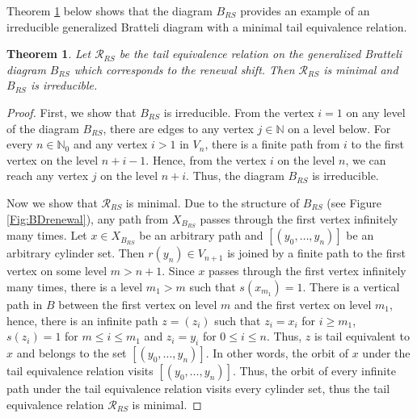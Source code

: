 \documentclass[11pt, twoside]{amsart}
\theoremstyle{definition}
\theoremstyle{remark}
\theoremstyle{plain}
\newtheorem{theorem}[definition]{Theorem}
\newcommand{\N}{\mathbb N}
\numberwithin{equation}{section}
\begin{document}
Theorem \ref{thm:minimalRrenewalshift} below shows that the diagram $B_{RS}$ provides an example of an irreducible generalized Bratteli diagram with a minimal tail equivalence relation. 

\begin{theorem}\label{thm:minimalRrenewalshift}
    Let $\mathcal{R}_{RS}$ be the tail equivalence relation on the generalized Bratteli diagram $B_{RS}$ which corresponds to the renewal shift. Then $\mathcal{R}_{RS}$ is minimal and $B_{RS}$ is irreducible.
\end{theorem} 

\begin{proof} First, we show that $B_{RS}$ is irreducible.
From the vertex $i = 1$ on any level of the diagram $B_{RS}$, there are edges to any vertex $j \in \N$ on a level below. 
For every $n \in \N_0$ and any vertex $i > 1$ in $V_n$, there is a finite path from $i$ to the first vertex on the level $n + i - 1$. Hence, from the vertex $i$ on the level $n$, we can reach any vertex $j$ on the level $n + i$. Thus, the diagram $B_{RS}$ is irreducible.

Now we show that $\mathcal{R}_{RS}$ is minimal. Due to the structure of $B_{RS}$ (see Figure \ref{Fig:BDrenewal}), any path from $X_{B_{RS}}$ passes through the first vertex infinitely many times. Let $x \in X_{B_{RS}}$ be an arbitrary path and $[(y_0, \ldots, y_n)]$ be an arbitrary cylinder set. Then $r(y_n) \in V_{n+1}$ is joined by a finite path to the first vertex on some level $m > n+1$. 
Since $x$ passes through the first vertex infinitely many times, there is a level $m_1 > m$ such that $s(x_{m_1}) = 1$. There is a vertical path in $B$ between the first vertex on level $m$ and the first vertex on level $m_1$, hence, there is an infinite path $z = (z_i)$ such that $z_i = x_i$ for $i \geq m_1$, $s(z_i) = 1$ for $m \leq i \leq m_1$ and $z_i = y_i$ for $0 \leq i \leq n$. Thus, $z$ is tail equivalent to $x$ and belongs to the set $[(y_0, \ldots, y_n)]$. In other words, the orbit of $x$ under the tail equivalence relation visits $[(y_0, \ldots, y_n)]$. Thus, the orbit
of every infinite path under the tail equivalence relation visits every cylinder set, thus the tail equivalence relation $\mathcal{R}_{RS}$ is minimal.  
\end{proof}
\end{document}
